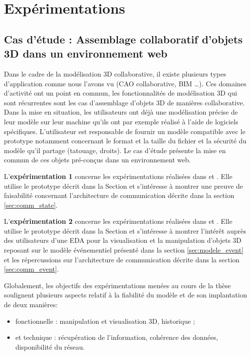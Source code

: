 \chapter{Expérimentations}
\chaptertable

\section{Cas d'étude : Assemblage collaboratif d'objets 3D dans un 
environnement web}
\label{sec:use_case}
Dans le cadre de la modélisation 3D collaborative, il existe plusieurs types 
d'application comme nous l'avons vu (\gls{CAO} collaborative, \gls{BIM} \dots). 
Ces domaines d'activité ont un point en commun, les fonctionnalités de 
modélisation 3D qui sont récurrentes sont les cas d'assemblage d'objets 3D de 
manières collaborative. Dans la mise en situation, les utilisateurs ont déjà une 
modélisation précise de leur modèle sur leur machine qu'ils ont par exemple 
réalisé à l'aide de logiciels spécifiques. L'utilisateur est responsable de fournir un 
modèle compatible avec le prototype notamment concernant le format et la taille 
du fichier et la sécurité du modèle qu'il partage (tatouage, droits). Le cas d'étude 
présente la mise en commun de ces objets pré-conçus dans un environnement 
web.

L'\textbf{expérimentation 1} concerne les expérimentations réalisées dans 
\cite{Desprat2015a} 
et \cite{Desprat2015b}. Elle utilise le prototype décrit dans la Section  et s'intéresse à montrer une preuve de faisabilité concernant l'architecture 
de communication décrite dans la section \ref{sec:comm_state}. 

 
L'\textbf{expérimentation 2} concerne les expérimentations réalisées dans 
\cite{Desprat2016} et 
\cite{Desprat2017}. Elle utilise le prototype décrit dans la Section  
et s'intéresse à montrer l'intérêt auprès des utilisateurs d'une \gls{EDA} pour la 
visualisation et la manipulation d'objets 3D reposant sur le modèle 
événementiel présenté dans la section \ref{sec:modele_event} et les 
répercussions sur l'architecture de 
communication décrite dans la section \ref{sec:comm_event}.

Globalement, les objectifs des expérimentations menées au cours de la thèse 
soulignent plusieurs aspects relatif à la fiabilité 
du modèle et de son implantation de deux manières: 
\begin{itemize}
	\item fonctionnelle : manipulation et visualisation 
	3D, historique ;
	\item et technique : récupération de l'information, cohérence des 
	données, disponibilité du réseau.
\end{itemize}


